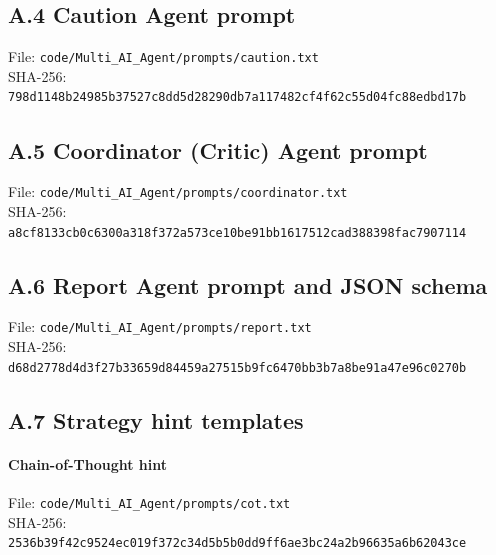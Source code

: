 \subsection*{A.4 Caution Agent prompt}
\label{ssec:prompt-caution}
File: \texttt{code/Multi\_AI\_Agent/prompts/caution.txt} \\
SHA-256: {\small\texttt{798d1148b24985b37527c8dd5d28290db7a117482cf4f62c55d04fc88edbd17b}}
\begin{small}

\end{small}

\subsection*{A.5 Coordinator (Critic) Agent prompt}
\label{ssec:prompt-coordinator}
File: \texttt{code/Multi\_AI\_Agent/prompts/coordinator.txt} \\
SHA-256: {\small\texttt{a8cf8133cb0c6300a318f372a573ce10be91bb1617512cad388398fac7907114}}
\begin{small}

\end{small}

\subsection*{A.6 Report Agent prompt and JSON schema}
\label{ssec:prompt-report}
File: \texttt{code/Multi\_AI\_Agent/prompts/report.txt} \\
SHA-256: {\small\texttt{d68d2778d4d3f27b33659d84459a27515b9fc6470bb3b7a8be91a47e96c0270b}}
\begin{small}

\end{small}

\subsection*{A.7 Strategy hint templates}
\label{ssec:prompt-strategy}
\paragraph{Chain-of-Thought hint}
File: \texttt{code/Multi\_AI\_Agent/prompts/cot.txt} \\
SHA-256: {\small\texttt{2536b39f42c9524ec019f372c34d5b5b0dd9ff6ae3bc24a2b96635a6b62043ce}}
\begin{small}

\end{small}

